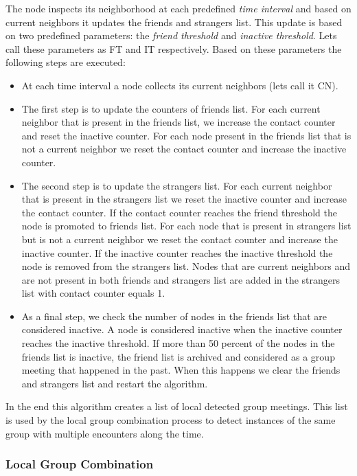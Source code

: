 The node inspects its neighborhood at each predefined \textit{time interval} and based on current neighbors
it updates the friends and strangers list. This update is based on two predefined parameters: the \textit{friend threshold}
and \textit{inactive threshold}. Lets call these parameters as FT and IT respectively. Based on these parameters the following
steps are executed:

\begin{itemize}
	\item At each time interval a node collects its current neighbors (lets call it CN).
	\item The first step is to update the counters of friends list. For each current neighbor that is present in the friends
	list, we increase the contact counter and reset the inactive counter. For each node present in the friends list that is
	not a current neighbor we reset the contact counter and increase the inactive counter.
	\item The second step is to update the strangers list. For each current neighbor that is present in the strangers list
	we reset the inactive counter and increase the contact counter. If the contact counter reaches the friend threshold
	the node is promoted to friends list. For each node that is present in strangers list but is not a current neighbor
	we reset the contact counter and increase the inactive counter. If the inactive counter reaches the inactive threshold
	the node is removed from the strangers list. Nodes that are current neighbors and are not present in both friends and strangers
	list are added in the strangers list with contact counter equals 1.
	\item As a final step, we check the number of nodes in the friends list that are considered inactive. A node is considered
	inactive when the inactive counter reaches the inactive threshold. If more than 50 percent of the nodes in the friends list
	is inactive, the friend list is archived and considered as a group meeting that happened in the past. When this happens we
	clear the friends and strangers list and restart the algorithm.
\end{itemize}

In the end this algorithm creates a list of local detected group meetings. This list is used by the local group combination process to
detect instances of the same group with multiple encounters along the time.

\subsubsection{Local Group Combination}

